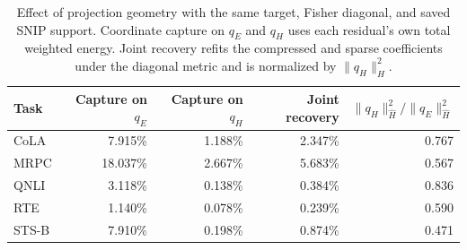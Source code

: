\begin{table}[t]
\centering\scriptsize
\caption{Effect of projection geometry with the same target, Fisher diagonal, and saved SNIP support. Coordinate capture on $q_E$ and $q_H$ uses each residual's own total weighted energy. Joint recovery refits the compressed and sparse coefficients under the diagonal metric and is normalized by $\|q_H\|_{\hat H}^2$.}
\label{tab:e5_geometry}
\begin{tabular}{lrrrr}
\toprule
Task & Capture on $q_E$ & Capture on $q_H$ & Joint recovery & $\|q_H\|_{\hat H}^2/\|q_E\|_{\hat H}^2$ \\
\midrule
CoLA & 7.915\% & 1.188\% & 2.347\% & 0.767 \\
MRPC & 18.037\% & 2.667\% & 5.683\% & 0.567 \\
QNLI & 3.118\% & 0.138\% & 0.384\% & 0.836 \\
RTE & 1.140\% & 0.078\% & 0.239\% & 0.590 \\
STS-B & 7.910\% & 0.198\% & 0.874\% & 0.471 \\
\bottomrule
\end{tabular}
\end{table}
